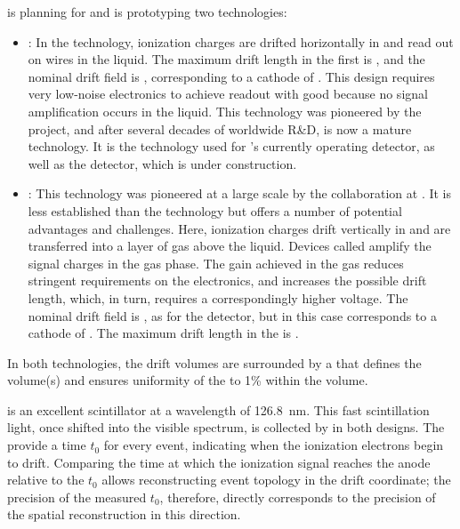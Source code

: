  is planning for and is prototyping two  technologies:
\begin{itemize}
\item {}: In the  technology, ionization charges are drifted horizontally in  and read out on wires in the liquid.  The maximum drift length in the first   is \spmaxdrift, and the nominal drift field is \spmaxfield, corresponding to a cathode  of \sptargetdriftvoltpos. This design requires very low-noise electronics to achieve readout with good  because no signal amplification occurs in the liquid. This technology was pioneered by the  project, and after several decades of worldwide R\&D, is now a mature technology. It is the technology used for 's currently operating  detector, as well as the  detector, which is under construction. 

\item {}: This technology was pioneered at a large scale by the  collaboration at . It is less established than the  technology but offers a number of potential advantages and challenges. Here, ionization charges drift vertically in  and are transferred into a layer of gas above the liquid. Devices called  amplify the signal charges  in the gas phase. The gain achieved in the gas reduces stringent requirements on the electronics, and increases the possible drift length, which, in turn, requires a correspondingly higher voltage. The nominal drift field is \dpnominaldriftfield, as for the  detector, but in this case corresponds to a cathode  of \dptargetdriftvoltpos.
The maximum drift length in the  is \dpmaxdrift{}.  
\end{itemize}
In both technologies, the drift volumes are surrounded by a  that defines the volume(s) and ensures uniformity of the \efield to 1\% within the volume.

 is an excellent scintillator at a wavelength of \SI{126.8}{\nano\meter}. This fast scintillation light, once shifted into the visible spectrum, is collected by  in both designs. The  provide a time $t_{0}$ for every event, indicating when the ionization electrons begin to drift. Comparing the time at which the ionization signal reaches the anode relative to the $t_{0}$ allows reconstructing event topology in the drift coordinate; the precision of the measured $t_{0}$, therefore, directly corresponds to the precision of the spatial reconstruction in this direction. 

